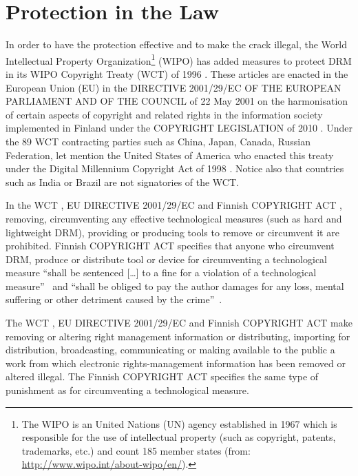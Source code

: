 \documentclass[11pt,a4paper,oneside]{memoir}
\begin{document}
\section{Protection in the Law}\label{def:law}

In order to have the protection effective and to make the crack illegal, the World Intellectual Property Organization\footnote{The WIPO is an United Nations (UN) agency established in 1967 which is responsible for the use of intellectual property (such as copyright, patents, trademarks, etc.) and count 185 member states (from: \url{http://www.wipo.int/about-wipo/en/}).} (WIPO) has added measures to protect DRM in its WIPO Copyright Treaty (WCT) of 1996 \cite[articles 11 and 12]{wipo:wct}. These articles are enacted in the European Union (EU) in the DIRECTIVE 2001/29/EC OF THE EUROPEAN PARLIAMENT AND OF THE COUNCIL of 22 May 2001 on the harmonisation of certain aspects of copyright and related rights in the information society \cite[chapter III]{eur-lex:2001/29/EC} implemented in Finland under the COPYRIGHT LEGISLATION of 2010 \cite[chapter 5a]{finlex:copyright_act}. Under the 89 WCT contracting parties such as China, Japan, Canada, Russian Federation, let mention the United States of America who enacted this treaty under the Digital Millennium Copyright Act of 1998 \cite[section 103]{gpo:dmca}. Notice also that countries such as India or Brazil are not signatories of the WCT.

\label{def:law_drm}In the WCT \cite[article 11]{wipo:wct}, EU DIRECTIVE 2001/29/EC \cite[article 6]{eur-lex:2001/29/EC} and Finnish COPYRIGHT ACT \cite[sections 50a and 50b]{finlex:copyright_act}, removing, circumventing any effective technological measures (such as hard and lightweight DRM), providing or producing tools to remove or circumvent it are prohibited. Finnish COPYRIGHT ACT  specifies that anyone who circumvent DRM, produce or distribute tool or device for circumventing a technological measure \textquotedblleft shall be sentenced [\ldots] to a fine for a violation of a technological measure\textquotedblright ~\cite[section 56e]{finlex:copyright_act} and \textquotedblleft shall be obliged to pay the author damages for any loss, mental suffering or other detriment caused by the crime\textquotedblright ~\cite[section 57(3)]{finlex:copyright_act}.

\label{def:law_watermark}The WCT \cite[article 12]{wipo:wct}, EU DIRECTIVE 2001/29/EC \cite[article 7]{eur-lex:2001/29/EC} and Finnish COPYRIGHT ACT \cite[section 50d]{finlex:copyright_act} make removing or altering right management information or distributing, importing for distribution, broadcasting, communicating or making available to the public a work from which electronic rights-management information has been removed or altered illegal. The Finnish COPYRIGHT ACT \cite[chapter 7, sections 56f and 57(3)]{finlex:copyright_act} specifies the same type of punishment as for circumventing a technological measure.
\end{document}
